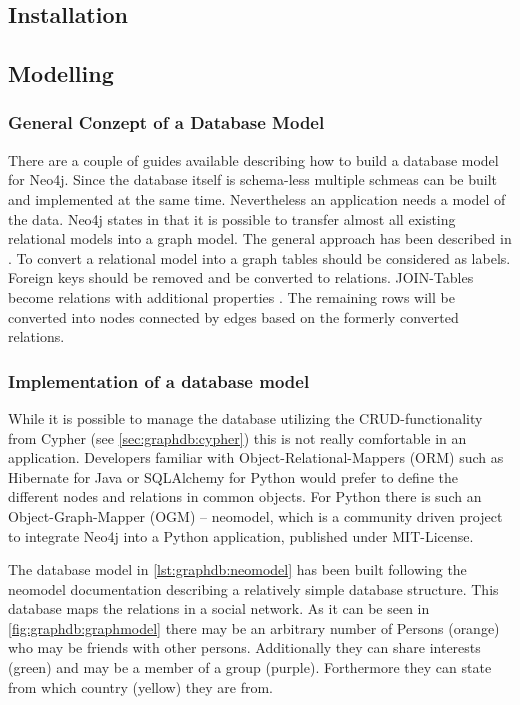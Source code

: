 \subsection{Installation}

\subsection{Modelling}
\subsubsection{General Conzept of a Database Model}
There are a couple of guides available describing how to build a database model for Neo4j. Since the database itself is schema-less multiple schmeas can be built and implemented at the same time.
Nevertheless an application needs a model of the data.
Neo4j states in \autocite{neo4j:rel_to_graph} that it is possible to transfer almost all existing relational models into a graph model.
The general approach has been described in \autocite{dzone:rel_to_graph}.
To convert a relational model into a graph tables should be considered as labels.
Foreign keys should be removed and be converted to relations.
JOIN-Tables become relations with additional properties \autocite{neo4j:graph_vs_rdbms}.
The remaining rows will be converted into nodes connected by edges based on the formerly converted relations.

\subsubsection{Implementation of a database model}
While it is possible to manage the database utilizing the CRUD-functionality from Cypher (see \ref{sec:graphdb:cypher}) this is not really comfortable in an application.
Developers familiar with Object-Relational-Mappers (ORM) such as Hibernate for Java or SQLAlchemy for Python would prefer to define the different nodes and relations in common objects.
For Python there is such an Object-Graph-Mapper (OGM) -- neomodel, which is a community driven project to integrate Neo4j into a Python application, published under MIT-License.

The database model in \ref{lst:graphdb:neomodel} has been built following the neomodel documentation \autocite{neomodel:rtd} describing a relatively simple database structure.
This database maps the relations in a social network.
As it can be seen in \ref{fig:graphdb:graphmodel} there may be an arbitrary number of Persons (orange) who may be friends with other persons.
Additionally they can share interests (green) and may be a member of a group (purple).
Forthermore they can state from which country (yellow) they are from.

